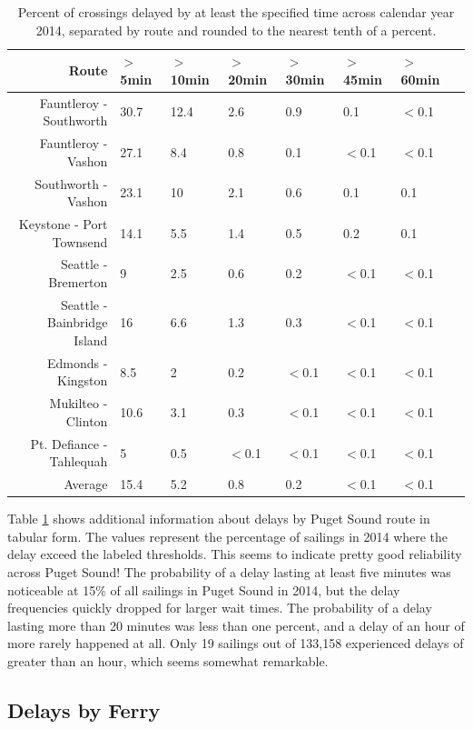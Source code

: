 \documentclass[11pt, letterpaper]{article}
\begin{document}
\begin{table}[ht]
\centering
\begin{tabular}{rlllllll}
  \hline
 Route & $>$5min & $>$10min & $>$20min & $>$30min & $>$45min & $>$60min \\ 
  \hline
 Fauntleroy - Southworth & 30.7 & 12.4 & 2.6 & 0.9 & 0.1 & $<$0.1 \\ 
 Fauntleroy - Vashon & 27.1 & 8.4 & 0.8 & 0.1 & $<$0.1 & $<$0.1 \\ 
 Southworth - Vashon & 23.1 & 10 & 2.1 & 0.6 & 0.1 & 0.1 \\ 
 Keystone - Port Townsend & 14.1 & 5.5 & 1.4 & 0.5 & 0.2 & 0.1 \\ 
 Seattle - Bremerton & 9 & 2.5 & 0.6 & 0.2 & $<$0.1 & $<$0.1 \\ 
 Seattle - Bainbridge Island & 16 & 6.6 & 1.3 & 0.3 & $<$0.1 & $<$0.1 \\ 
 Edmonds - Kingston & 8.5 & 2 & 0.2 & $<$0.1 & $<$0.1 & $<$0.1 \\ 
 Mukilteo - Clinton & 10.6 & 3.1 & 0.3 & $<$0.1 & $<$0.1 & $<$0.1 \\ 
 Pt. Defiance - Tahlequah & 5 & 0.5 & $<$0.1 & $<$0.1 & $<$0.1 & $<$0.1 \\ 
 \hline
 Average & 15.4 & 5.2 & 0.8 & 0.2 & $<$0.1 & $<$0.1 \\ 
   \hline
\end{tabular}
\caption{Percent of crossings delayed by at least the specified time across calendar year 2014, separated by route and rounded to the nearest tenth of a percent. }
\label{routetable}
\end{table}


Table \ref{routetable} shows additional information about delays by Puget Sound route in tabular form. The values represent the percentage of sailings in 2014 where the delay exceed the labeled thresholds. This seems to indicate pretty good reliability across Puget Sound! The probability of a delay lasting at least five minutes was noticeable at 15\% of all sailings in Puget Sound in 2014, but the delay frequencies quickly dropped for larger wait times. The probability of a delay lasting more than 20 minutes was less than one percent, and a delay of an hour of more rarely happened at all. Only 19 sailings out of 133,158 experienced delays of greater than an hour, which seems somewhat remarkable.




\subsection*{Delays by Ferry}
\end{document}
